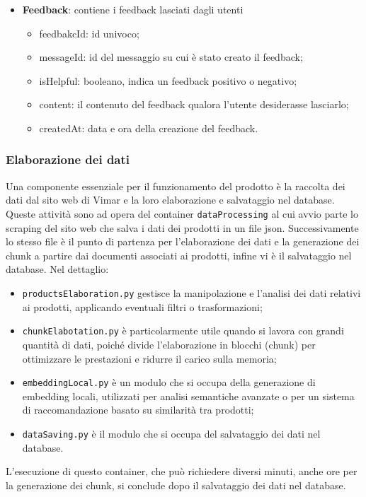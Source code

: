 \begin{itemize}
    \item \textbf{Feedback}: contiene i feedback lasciati dagli utenti
    \begin{itemize}
        \item feedbakcId: id univoco;
        \item messageId: id del messaggio su cui è stato creato il feedback;
        \item isHelpful: booleano, indica un feedback positivo o negativo;
        \item content: il contenuto del feedback qualora l'utente desiderasse lasciarlo;
        \item createdAt: data e ora della creazione del feedback.
    \end{itemize} 
\end{itemize}


\subsubsection{Elaborazione dei dati}
Una  componente essenziale per il funzionamento del prodotto è la raccolta dei dati dal sito web di Vimar e la loro elaborazione e salvataggio nel database. Queste attività sono ad opera del container  \texttt{dataProcessing} al cui avvio parte lo scraping del sito web che salva i dati dei prodotti in un file json. Successivamente lo stesso file è il punto di partenza per l'elaborazione dei dati e la generazione dei chunk a partire dai documenti associati ai prodotti, infine vi è il salvataggio nel database.  
Nel dettaglio:
\begin{itemize}
\item \texttt{productsElaboration.py} gestisce la manipolazione e l'analisi dei dati relativi ai prodotti, applicando eventuali filtri o trasformazioni;
\item \texttt{chunkElabotation.py} è particolarmente utile quando si lavora con grandi quantità di dati, poiché divide l'elaborazione in blocchi (chunk) per ottimizzare le prestazioni e ridurre il carico sulla memoria;
\item \texttt{embeddingLocal.py} è un modulo che si occupa della generazione di embedding locali,  utilizzati per analisi semantiche avanzate o per un sistema di raccomandazione basato su similarità tra prodotti;
\item \texttt{dataSaving.py} è il modulo che si occupa del salvataggio dei dati nel database.
\end{itemize}

L'esecuzione di questo container, che può richiedere diversi minuti, anche ore per la generazione dei chunk, si conclude dopo il salvataggio dei dati nel database.

